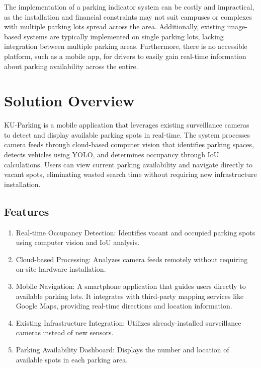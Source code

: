 The implementation of a parking indicator system can be costly and impractical, as the installation and financial constraints may not suit campuses or complexes with multiple parking lots spread across the area. Additionally, existing image-based systems are typically implemented on single parking lots, lacking integration between multiple parking areas. Furthermore, there is no accessible platform, such as a mobile app, for drivers to easily gain real-time information about parking availability across the entire.

\section{Solution Overview}
\label{section:solution-overview}

KU-Parking is a mobile application that leverages existing surveillance cameras to detect and display available parking spots in real-time.
The system processes camera feeds through cloud-based computer vision that identifies parking spaces, detects vehicles using YOLO, and determines occupancy through IoU calculations.
Users can view current parking availability and navigate directly to vacant spots, eliminating wasted search time without requiring new infrastructure installation.


\subsection{Features}
\label{subsection:features}

\begin{enumerate}[leftmargin=80pt]
    \item Real-time Occupancy Detection: Identifies vacant and occupied parking spots using computer vision and IoU analysis.
    \item Cloud-based Processing: Analyzes camera feeds remotely without requiring on-site hardware installation.
    \item Mobile Navigation: A smartphone application that guides users directly to available parking lots. It integrates with third-party mapping services like Google Maps, providing real-time directions and location information.
    \item Existing Infrastructure Integration: Utilizes already-installed surveillance cameras instead of new sensors.
    \item Parking Availability Dashboard: Displays the number and location of available spots in each parking area.
    \end{enumerate}

